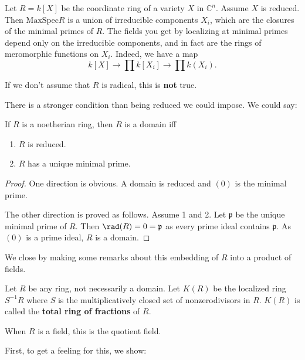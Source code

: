 \begin{example} 
Let $R = k[X]$ be the coordinate ring of a variety $X$ in $\mathbb{C}^n$. Assume $X$ is
reduced. Then $\mathrm{MaxSpec} R$ is a union of irreducible components $X_i$, which
are the closures of the minimal primes of $R$. The fields you get by localizing
at minimal primes depend only on the irreducible components, and in fact are
the rings of meromorphic functions on $X_i$. 
Indeed, we have a map
\[ k[X] \to \prod k[X_i] \to \prod k(X_i).  \]

If we don't assume that $R$ is radical, this is \textbf{not} true.
\end{example} 

There is a stronger condition than being reduced we could impose. We could say:

\begin{proposition} 
If $R$ is a noetherian ring, then $R$ is a domain iff 
\begin{enumerate}
\item $R$ is reduced. 
\item $R$ has a unique minimal prime.
\end{enumerate}
\end{proposition} 
\begin{proof} 
One direction is obvious. A domain is reduced and $(0)$ is the minimal prime. 

The other direction is proved as follows. Assume 1 and 2. Let $\mathfrak{p}$ be
the unique minimal prime of $R$. Then $\rad (R) = 0 = \mathfrak{p}$ as every
prime ideal contains $\mathfrak{p}$. As $(0)$ is a prime ideal, $R$ is a domain.
\end{proof} 

We close by making some remarks about this embedding of $R$ into a product of
fields. 

\begin{definition} 
Let $R$ be any ring, not necessarily a domain. Let $K(R)$ be the localized ring
$S^{-1}R$ where $S$ is the multiplicatively closed set of nonzerodivisors in
$R$.  $K(R)$ is called the \textbf{total ring of fractions} of $R$.

When $R$ is a field, this is the quotient field.
\end{definition} 

First, to get a feeling for this, we show:

